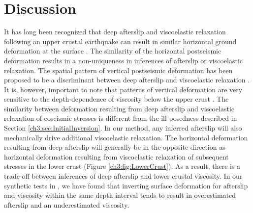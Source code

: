 \section{Discussion}\label{Discussion}
It has long been recognized that deep afterslip and viscoelastic
relaxation following an upper crustal earthquake can result in similar
horizontal ground deformation at the surface
\citep[e.g.,][]{Savage1990, Pollitz2001, Hearn2003, Feigl2006}. The
similarity of the horizontal postseismic deformation results in a
non-uniqueness in inferences of afterslip or viscoelastic relaxation.
The spatial pattern of vertical postseismic deformation has been
proposed to be a discriminant between deep afterslip and viscoelastic
relaxation \citep[e.g.,][]{Pollitz2001, Hearn2003}. It is, however,
important to note that patterns of vertical deformation are very
sensitive to the depth-dependence of viscosity below the upper crust
\citep{Yang1981,Hetland2014}.  The similarity between deformation
resulting from deep afterslip and viscoelastic relaxation of coseismic
stresses is different from the ill-posedness described in Section
\ref{ch3:sec:InitialInversion}. In our method, any inferred afterslip
will also mechanically drive additional viscoelastic relaxation.  The
horizontal deformation resulting from deep afterslip will generally be
in the opposite direction as horizontal deformation resulting from
viscoelastic relaxation of subsequent stresses in the lower crust
(Figure \ref{ch3:fig:LowerCrust}).  As a result, there is a trade-off
between inferences of deep afterslip and lower crustal viscosity.  In
our synthetic tests in \citet{Hines2016}, we have found that inverting
surface deformation for afterslip and viscosity within the same depth
interval tends to result in overestimated afterslip and an
underestimated viscosity.

